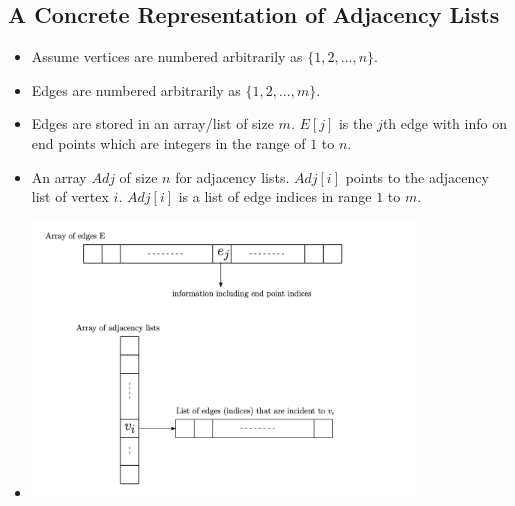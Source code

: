 \documentclass[12pt]{article}
\begin{document}
\subsection{A Concrete Representation of Adjacency Lists}
\begin{itemize}
    \item Assume vertices are numbered arbitrarily as $\{ 1, 2, ..., n \}$.
    \item Edges are numbered arbitrarily as $\{ 1, 2, ..., m \}$.
    \item Edges are stored in an array/list of size $m$. $E[j]$ is the $j$th edge with info on end points which are integers in the range of $1$ to $n$.
    \item An array $Adj$ of size $n$ for adjacency lists. $Adj[i]$ points to the adjacency list of vertex $i$. $Adj[i]$ is a list of edge indices in range $1$ to $m$.
    \item[] \includegraphics[width=0.8\textwidth]{images/adjacency-list-representation.jpg}
\end{itemize}
\end{document}

